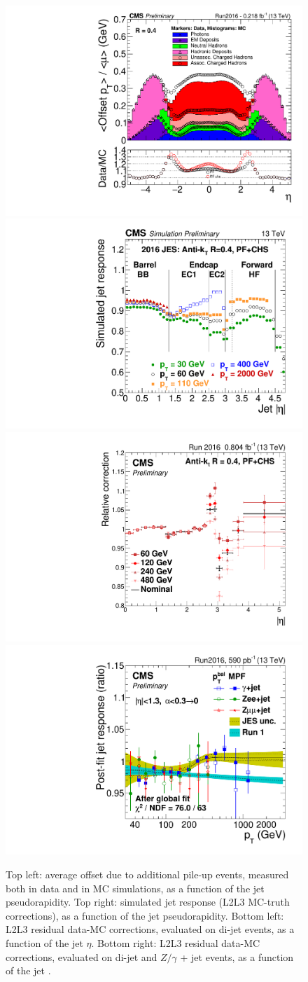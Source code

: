 \begin{figure}[!htb]
  \centering
    \includegraphics[width=.5\textwidth]{figures/JetPlots/stack2016.pdf}%
    \includegraphics[width=.5\textwidth]{figures/JetPlots/CMSresponse_ak4pfchs_L1FastL2L3.pdf}
\\
    \includegraphics[width=.5\textwidth]{figures/JetPlots/L2Res_logpt_MPF_kFSRfit_AK4PFchs_pythia8_2016.pdf}%
    \includegraphics[width=.5\textwidth]{figures/JetPlots/globalFitL3res_shifted_2016.pdf}

  \caption{Top left: average \pt offset due to additional pile-up events, measured both in data and in MC simulations, as a function of the jet pseudorapidity. Top right: simulated jet response (L2L3 MC-truth corrections), as a function of the jet pseudorapidity. Bottom left: L2L3 residual data-MC corrections, evaluated on di-jet events, as a function of the jet $\eta$. Bottom right: L2L3 residual data-MC corrections, evaluated on di-jet and $Z/\gamma$ + jet events, as a function of the jet \pt.}
  \label{fig:plot_JEC}
\end{figure}

